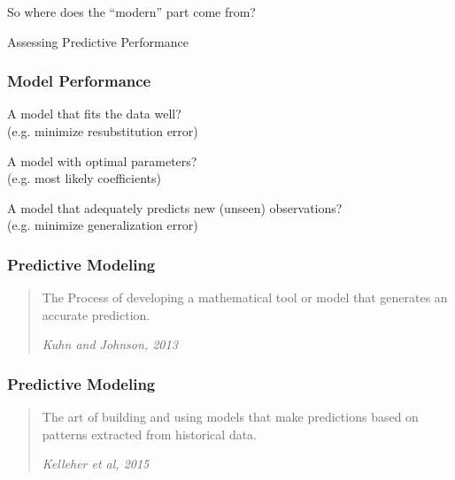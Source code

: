 \documentclass[12pt]{beamer}\usepackage[]{graphicx}\usepackage[]{color}
\begin{document}

\begin{frame}
\begin{center}
{\lolit So where does the ``modern'' part come from?}

\Large{\mdlit Assessing Predictive Performance}
\end{center}
\end{frame}


\begin{frame}
\frametitle{Model Performance}

\bbi
  \item A model that fits the data well? \\
  {\lolit (e.g. minimize resubstitution error)}
  \item A model with optimal parameters? \\
  {\lolit (e.g. most likely coefficients)}
  \item A model that adequately predicts new (unseen) observations? \\
  {\lolit (e.g. minimize generalization error)}
\ei
\eb

\end{frame}


\begin{frame}
\frametitle{Predictive Modeling}

{\Large
\begin{quotation}
\noindent The Process of developing a mathematical tool or model that generates an accurate prediction.

\bigskip
{\small \noindent \textit{Kuhn and Johnson, 2013}}

\end{quotation}
}

\end{frame}


\begin{frame}
\frametitle{Predictive Modeling}

{\Large 
\begin{quotation}
\noindent The art of building and using models that make predictions based on patterns extracted from historical data.

\bigskip
{\small \noindent \textit{Kelleher et al, 2015}}
\end{quotation}
}

\end{frame}
\end{document}
